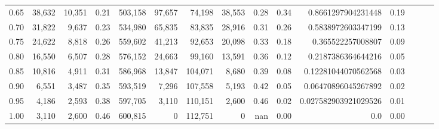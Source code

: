\begin{tabular}{rrrrrrrrrrrrrrr}
0.65 &  38,632 &  10,351 &  0.21 &  503,158 &   97,657 &   74,198 &   38,553 &  0.28 &  0.34 &    0.8661297904231448 &      0.19 \\
0.70 &  31,822 &   9,637 &  0.23 &  534,980 &   65,835 &   83,835 &   28,916 &  0.31 &  0.26 &    0.5838972603347199 &      0.13 \\
0.75 &  24,622 &   8,818 &  0.26 &  559,602 &   41,213 &   92,653 &   20,098 &  0.33 &  0.18 &     0.365522257008807 &      0.09 \\
0.80 &  16,550 &   6,507 &  0.28 &  576,152 &   24,663 &   99,160 &   13,591 &  0.36 &  0.12 &    0.2187386364644216 &      0.05 \\
0.85 &  10,816 &   4,911 &  0.31 &  586,968 &   13,847 &  104,071 &    8,680 &  0.39 &  0.08 &   0.12281044070562568 &      0.03 \\
0.90 &   6,551 &   3,487 &  0.35 &  593,519 &    7,296 &  107,558 &    5,193 &  0.42 &  0.05 &   0.06470896045267892 &      0.02 \\
0.95 &   4,186 &   2,593 &  0.38 &  597,705 &    3,110 &  110,151 &    2,600 &  0.46 &  0.02 &  0.027582903921029526 &      0.01 \\
1.00 &   3,110 &   2,600 &  0.46 &  600,815 &        0 &  112,751 &        0 &   nan &  0.00 &                   0.0 &      0.00 \\
\bottomrule
\end{tabular}
